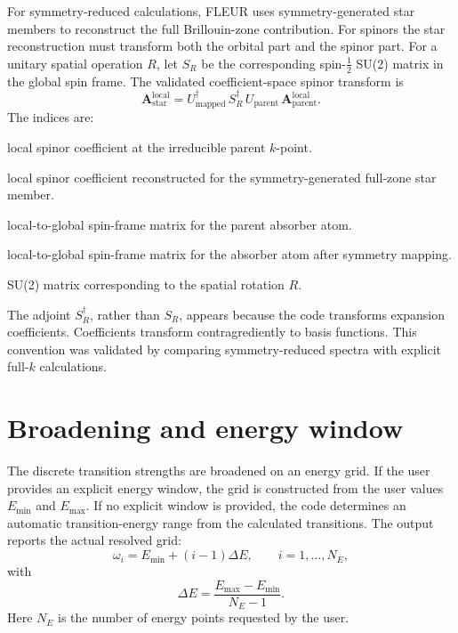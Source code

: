 \documentclass[11pt,a4paper]{article}
\begin{document}
For symmetry-reduced calculations, FLEUR uses symmetry-generated star members
to reconstruct the full Brillouin-zone contribution. For spinors the
star reconstruction must transform both the orbital part and the spinor part.
For a unitary spatial operation \(R\), let \(S_R\) be the corresponding
spin-\(\frac12\) SU(2) matrix in the global spin frame. The validated
coefficient-space spinor transform is
\begin{equation}
\label{eq:spinor-star}
  \mathbf{A}^{\mathrm{local}}_{\mathrm{star}}
  =
  U_{\mathrm{mapped}}^{\dagger}\,
  S_R^{\dagger}\,
  U_{\mathrm{parent}}\,
  \mathbf{A}^{\mathrm{local}}_{\mathrm{parent}} .
\end{equation}
The indices are:
\begin{description}[leftmargin=2.7cm,style=nextline]
  \item[\(\mathbf{A}^{\mathrm{local}}_{\mathrm{parent}}\)] local spinor
  coefficient at the irreducible parent \(k\)-point.
  \item[\(\mathbf{A}^{\mathrm{local}}_{\mathrm{star}}\)] local spinor
  coefficient reconstructed for the symmetry-generated full-zone star member.
  \item[\(U_{\mathrm{parent}}\)] local-to-global spin-frame matrix for the
  parent absorber atom.
  \item[\(U_{\mathrm{mapped}}\)] local-to-global spin-frame matrix for the
  absorber atom after symmetry mapping.
  \item[\(S_R\)] SU(2) matrix corresponding to the spatial rotation \(R\).
\end{description}
The adjoint \(S_R^\dagger\), rather than \(S_R\), appears because the code
transforms expansion coefficients. Coefficients transform contragrediently to
basis functions. This convention was validated by comparing symmetry-reduced
spectra with explicit full-\(k\) calculations.

\section{Broadening and energy window}

The discrete transition strengths are broadened on an energy grid. If the user
provides an explicit energy window, the grid is constructed from the user
values \(E_{\min}\) and \(E_{\max}\). If no explicit window is provided, the code
determines an automatic transition-energy range from the calculated transitions.
The output reports the actual resolved grid:
\begin{equation}
  \omega_i = E_{\min} + (i-1)\Delta E,\qquad
  i=1,\ldots,N_E,
\end{equation}
with
\begin{equation}
  \Delta E =
  \frac{E_{\max}-E_{\min}}{N_E-1}.
\end{equation}
Here \(N_E\) is the number of energy points requested by the user.
\end{document}
